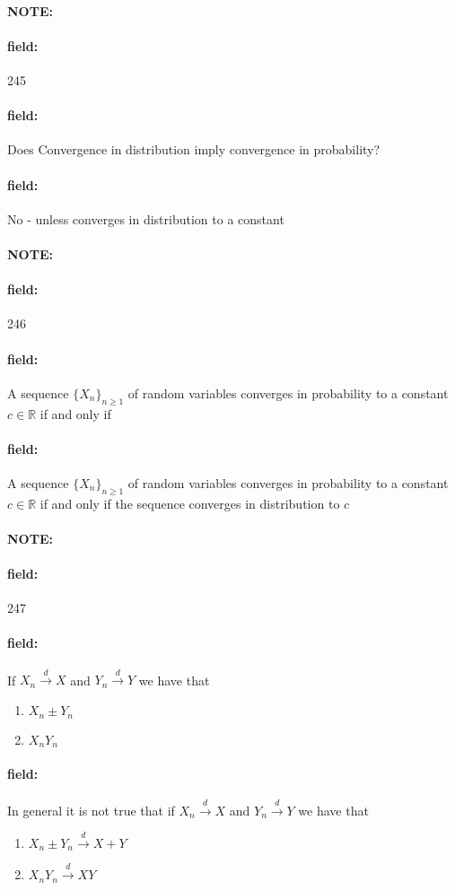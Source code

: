 \documentclass[12pt]{article}
\newenvironment{note}{\paragraph{NOTE:}}{}
\newenvironment{field}{\paragraph{field:}}{}
\begin{document}
\begin{note} \begin{field} \tiny 245 \end{field}
  \begin{field}
    Does Convergence in distribution imply convergence in probability?
  \end{field}
  \begin{field}
    No - unless converges in distribution to a constant
  \end{field}
\end{note}

\begin{note} \begin{field} \tiny 246 \end{field}
  \begin{field}
    A sequence $\{X_n\}_{n \geq 1}$ of random variables converges in probability to a constant $c \in \mathbb{R}$ if and only if
  \end{field}
  \begin{field}
    A sequence $\{X_n\}_{n \geq 1}$ of random variables converges in probability to a constant $c \in \mathbb{R}$ if and only if the sequence converges in distribution to $c$
  \end{field}
\end{note}

\begin{note} \begin{field} \tiny 247 \end{field}
  \begin{field}
    If $X_n \overset{d}{\to} X$ and $Y_n \overset{d}{\to} Y$ we have that
    \begin{enumerate}
      \item $X_n \pm Y_n $
      \item $X_nY_n $
    \end{enumerate}
  \end{field}
  \begin{field}
    In general it is not true that if $X_n \overset{d}{\to} X$ and $Y_n \overset{d}{\to} Y$ we have that
    \begin{enumerate}
      \item $X_n \pm Y_n \overset{d}{\to} X + Y$
      \item $X_nY_n \overset{d}{\to} XY$
    \end{enumerate}
  \end{field}
\end{note}
\end{document}
